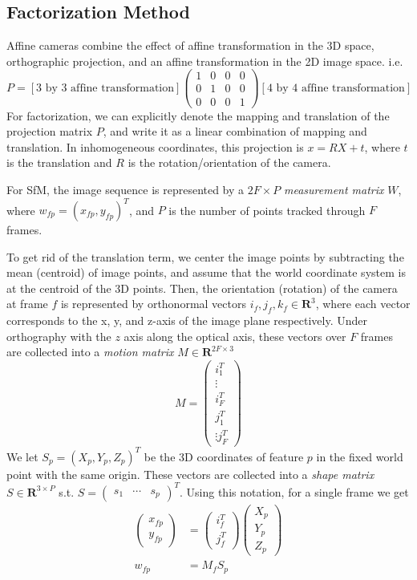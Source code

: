 \documentclass[a4paper]{article}
\begin{document}
\subsection{Factorization Method}
Affine cameras combine the effect of affine transformation in the 3D
space, orthographic projection, and an affine transformation in the 2D
image space. i.e. $$P=[\text{3 by 3 affine transformation}]\begin{pmatrix}
  1&0 & 0& 0 \\0 & 1& 0 & 0 \\ 0 & 0 & 0 & 1
\end{pmatrix}[\text{4 by 4 affine transformation}] $$ For factorization, we can explicitly denote the mapping
and translation of the projection matrix $P$, and write it
as a linear combination of mapping and translation. In
inhomogeneous coordinates, this projection is $x =RX + t$, where $t$
is the translation and $R$ is the rotation/orientation of the camera.

For SfM, the image sequence is represented by a $2F\times P$ \emph{measurement matrix
}$W$, where $w_{fp} = (x_{fp}, y_{fp})^T$, and
$P$ is the number of points tracked through $F$
frames.  

To get rid of the translation term, we center the image points by
subtracting the mean (centroid) of image points, and assume that
the world coordinate system is at the centroid of the 3D points. Then,
the orientation (rotation)
of the camera at frame $f$ is represented by orthonormal
vectors $i_f, j_f, k_f \in \mathbf{R}^{3}$, where each vector
corresponds to the x, y, and z-axis of the image plane
respectively. Under orthography with the $z$ axis along the optical
axis, these vectors over $F$ frames are collected into a
\emph{motion matrix} $M\in \mathbf{R}^{2F \times 3}$ $$M =
\begin{pmatrix}
  i_1^T\\ \vdots \\  i_F^T \\ j_1^T \\ \vdots j_F^T
\end{pmatrix}
$$
We let $S_p = (X_p, Y_p, Z_p)^T$ be the 3D coordinates of feature $p$ in the fixed world point with the same origin. These vectors are collected into a
\emph{shape matrix} $S\in \mathbf{R}^{3 \times P}$ s.t. $S =
\begin{pmatrix}
  s_1 & \cdots & s_p
\end{pmatrix}^T$. Using this notation, for a single frame we get
\begin{align*}
  \begin{pmatrix}
    x_{fp}\\y_{fp}
  \end{pmatrix} &=
  \begin{pmatrix}
    i_{f}^T\\j_{f}^T
  \end{pmatrix}
  \begin{pmatrix}
    X_p\\ Y_p\\ Z_p
  \end{pmatrix}\\
w_{fp} &= M_fS_p  
\end{align*}
\end{document}
